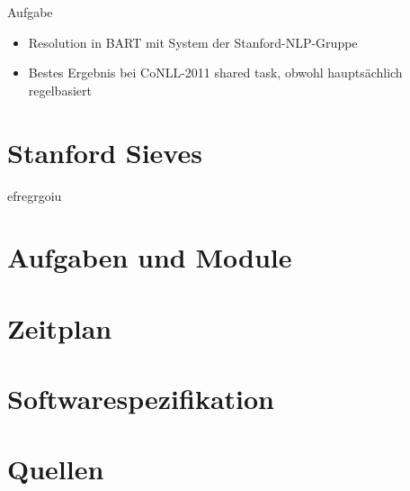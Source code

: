 \documentclass[11pt,a4paper]{beamer}
\begin{document}
\begin{frame}{Aufgabe}
\begin{itemize}
\item Resolution in BART mit System der Stanford-NLP-Gruppe
\item Bestes Ergebnis bei CoNLL-2011 shared task, obwohl hauptsächlich regelbasiert
\end{itemize}
\end{frame}

\section{Stanford Sieves}
\begin{frame}
efregrgoiu
\end{frame}

\section{Aufgaben und Module}
\section{Zeitplan}
    \begin{gantt}{10}{9}
    \begin{ganttitle}
    \end{ganttitle}
    \begin{ganttitle}
    \end{ganttitle}
  \end{gantt}
  



\section{Softwarespezifikation}
\section{Quellen}
\end{document}
